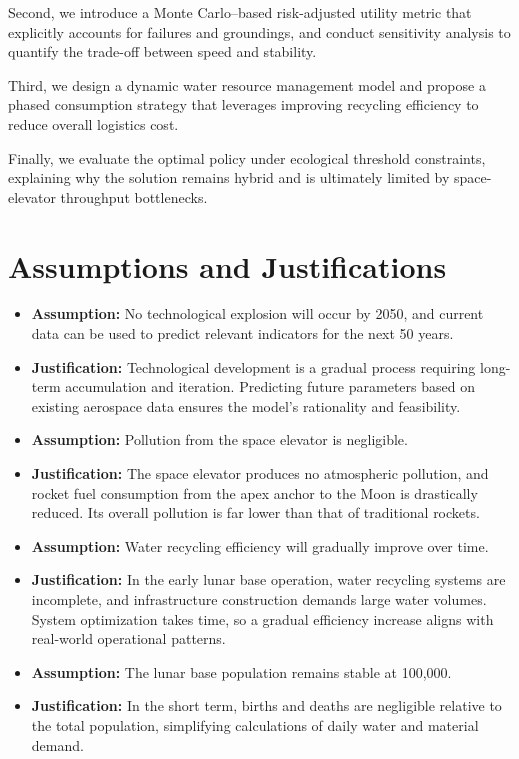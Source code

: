 \documentclass{mcmthesis}
\begin{document}
\indent Second, we introduce a Monte Carlo–based risk-adjusted utility metric that explicitly accounts for failures and groundings, and conduct sensitivity analysis to quantify the trade-off between speed and stability.

\indent Third, we design a dynamic water resource management model and propose a phased consumption strategy that leverages improving recycling efficiency to reduce overall logistics cost.

\indent Finally, we evaluate the optimal policy under ecological threshold constraints, explaining why the solution remains hybrid and is ultimately limited by space-elevator throughput bottlenecks.

\section{Assumptions and Justifications}
\begin{itemize}\item {\bf Assumption:} No technological explosion will occur by 2050, and current data can be used to predict relevant indicators for the next 50 years.\item {\bf Justification:} Technological development is a gradual process requiring long-term accumulation and iteration. Predicting future parameters based on existing aerospace data ensures the model’s rationality and feasibility.\item {\bf Assumption:} Pollution from the space elevator is negligible.\item {\bf Justification:} The space elevator produces no atmospheric pollution, and rocket fuel consumption from the apex anchor to the Moon is drastically reduced. Its overall pollution is far lower than that of traditional rockets.\item {\bf Assumption:} Water recycling efficiency will gradually improve over time.\item {\bf Justification:} In the early lunar base operation, water recycling systems are incomplete, and infrastructure construction demands large water volumes. System optimization takes time, so a gradual efficiency increase aligns with real-world operational patterns.\item {\bf Assumption:} The lunar base population remains stable at 100,000.\item {\bf Justification:} In the short term, births and deaths are negligible relative to the total population, simplifying calculations of daily water and material demand.\end{itemize}
\end{document}
